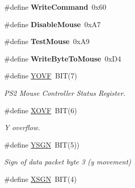 \begin{DoxyCompactItemize}
\item 
\hypertarget{group__i8042_ga177bb59d36f14c1024b2de1601693605}{\#define {\bfseries Write\-Command}~0x60}\label{group__i8042_ga177bb59d36f14c1024b2de1601693605}

\item 
\hypertarget{group__i8042_ga884864c92108739e60113ca2079cbe71}{\#define {\bfseries Disable\-Mouse}~0x\-A7}\label{group__i8042_ga884864c92108739e60113ca2079cbe71}

\item 
\hypertarget{group__i8042_gab47f9ef099e1f33e026e5ee549900624}{\#define {\bfseries Test\-Mouse}~0x\-A9}\label{group__i8042_gab47f9ef099e1f33e026e5ee549900624}

\item 
\hypertarget{group__i8042_gacd39f8cd57b13e1417000da0e98971b5}{\#define {\bfseries Write\-Byte\-To\-Mouse}~0x\-D4}\label{group__i8042_gacd39f8cd57b13e1417000da0e98971b5}

\item 
\#define \hyperlink{group__i8042_ga08deb639aef83c70892a364261b09133}{Y\-O\-V\-F}~B\-I\-T(7)
\begin{DoxyCompactList}\small\item\em P\-S2 Mouse Controller Status Register. \end{DoxyCompactList}\item 
\hypertarget{group__i8042_gac3172c891b25dafed9ced2476aa03cf1}{\#define \hyperlink{group__i8042_gac3172c891b25dafed9ced2476aa03cf1}{X\-O\-V\-F}~B\-I\-T(6)}\label{group__i8042_gac3172c891b25dafed9ced2476aa03cf1}

\begin{DoxyCompactList}\small\item\em Y overflow. \end{DoxyCompactList}\item 
\hypertarget{group__i8042_ga5c610c7c656c4cf62564a959c30e0245}{\#define \hyperlink{group__i8042_ga5c610c7c656c4cf62564a959c30e0245}{Y\-S\-G\-N}~B\-I\-T(5))}\label{group__i8042_ga5c610c7c656c4cf62564a959c30e0245}

\begin{DoxyCompactList}\small\item\em Sign of data packet byte 3 (y movement) \end{DoxyCompactList}\item 
\hypertarget{group__i8042_ga1829ceaee57583878dbef19f0bc1a724}{\#define \hyperlink{group__i8042_ga1829ceaee57583878dbef19f0bc1a724}{X\-S\-G\-N}~B\-I\-T(4)}\label{group__i8042_ga1829ceaee57583878dbef19f0bc1a724}


\end{DoxyCompactItemize}
